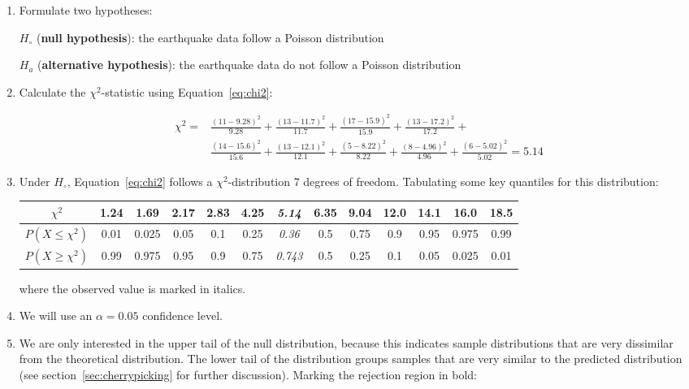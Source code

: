 \begin{enumerate}
\item  Formulate two hypotheses:

  $H_\circ$ (\textbf{null hypothesis}):
  the earthquake data follow a Poisson distribution

  $H_a$ (\textbf{alternative hypothesis}):
  the earthquake data do not follow a Poisson distribution
  
\item Calculate the $\chi^2$-statistic using Equation~\ref{eq:chi2}:

  \begin{equation}
    \begin{split}
      \chi^2 = &
      \frac{(11-9.28)^2}{9.28} + \frac{(13-11.7)^2}{11.7} +
      \frac{(17-15.9)^2}{15.9} + \frac{(13-17.2)^2}{17.2} + \\
      & \frac{(14-15.6)^2}{15.6} + \frac{(13-12.1)^2}{12.1} +
      \frac{(5-8.22)^2}{8.22} + \frac{(8-4.96)^2}{4.96} +
      \frac{(6-5.02)^2}{5.02} = 5.14
    \end{split}
  \end{equation}

\item Under $H_\circ$, Equation~\ref{eq:chi2} follows a
  $\chi^2$-distribution 7 degrees of freedom. Tabulating some key
  quantiles for this distribution:

  \begin{center}
    \begin{tabular}{c|c@{\gap}c@{\gap}c@{\gap}c@{\gap}
        c@{\gap}c@{\gap}c@{\gap}c@{\gap}c@{\gap}c@{\gap}c@{\gap}c}
      $\chi^2$ & 1.24 & 1.69 & 2.17 & 2.83 & 4.25 & \textit{5.14} &
      6.35 & 9.04 & 12.0 & 14.1 & 16.0 & 18.5 \\ \hline
      $P(X\leq{\chi^2})$ & 0.01 & 0.025 & 0.05 & 0.1 & 0.25 &
      \textit{0.36} & 0.5 & 0.75 & 0.9 & 0.95 & 0.975 & 0.99 \\
      $P(X\geq{\chi^2})$ & 0.99 & 0.975 & 0.95 & 0.9 & 0.75 &
      \textit{0.743} & 0.5 & 0.25 & 0.1 & 0.05 & 0.025 & 0.01
    \end{tabular}
  \end{center}

  \noindent where the observed value is marked in italics.
  
\item We will use an $\alpha = 0.05$ confidence level.

\item We are only interested in the upper tail of the null
  distribution, because this indicates sample distributions that are
  very dissimilar from the theoretical distribution. The lower tail of
  the distribution groups samples that are very similar to the
  predicted distribution (see section~\ref{sec:cherrypicking} for
  further discussion). Marking the rejection region in bold:
  

\end{enumerate}
